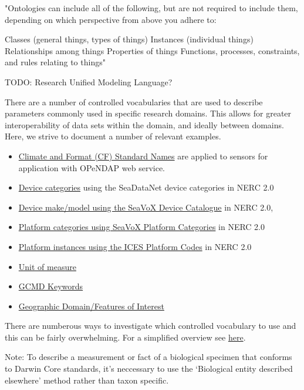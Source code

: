 \documentclass[]{book}
\begin{document}
"Ontologies can include all of the following, but are not required to include them, depending on which perspective from above you adhere to:

Classes (general things, types of things)
Instances (individual things)
Relationships among things
Properties of things
Functions, processes, constraints, and rules relating to things"

TODO: Research Unified Modeling Language?

There are a number of controlled vocabularies that are used to describe parameters commonly used in specific research domains. This allows for greater interoperability of data sets within the domain, and ideally between domains. Here, we strive to document a number of relevant examples.

\begin{itemize}
\item
  \href{\%22http://cfconventions.org/standard-names.html\%22}{Climate and Format (CF) Standard Names} are applied to sensors for application with OPeNDAP web service.
\item
  \href{\%22http://vocab.nerc.ac.uk/collection/L05/current/\%22}{Device categories} using the SeaDataNet device categories in NERC 2.0
\item
  \href{\%22http://vocab.nerc.ac.uk/collection/L22/current/\%22}{Device make/model using the SeaVoX Device Catalogue} in NERC 2.0,
\item
  \href{\%22http://vocab.nerc.ac.uk/collection/L06/current/\%22}{Platform categories using SeaVoX Platform Categories} in NERC 2.0
\item
  \href{\%22http://vocab.nerc.ac.uk/collection/C17/current/\%22}{Platform instances using the ICES Platform Codes} in NERC 2.0
\item
  \href{\%22http://vocab.nerc.ac.uk/collection/P06/current/\%22}{Unit of measure}
\item
  \href{\%22http://vocab.nerc.ac.uk/collection/P04/current/\%22}{GCMD Keywords}
\item
  \href{\%22http://vocab.nerc.ac.uk/collection/C19/current/\%22}{Geographic Domain/Features of Interest}
\end{itemize}

There are numberous ways to investigate which controlled vocabulary to use and this can be fairly overwhelming. For a simplified overview see \href{\%22http://seadatanet.maris2.nl/v_bodc_vocab_v2/vocab_relations.asp?lib=P08\%22}{here}.

Note: To describe a measurement or fact of a biological specimen that conforms to Darwin Core standards, it's neccessary to use the `Biological entity described elsewhere' method rather than taxon specific.
\end{document}
